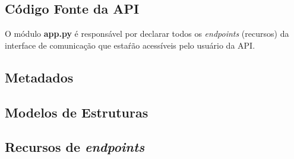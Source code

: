 \documentclass[12pt, openright, oneside, a4paper, brazil]{abntex2}
\begin{document}
\begin{apendicesenv}

	\chapter{Código Fonte da API} \label{source_code}

	O módulo \textbf{app.py} é responsável por declarar todos os \textit{endpoints} (recursos) da interface de comunicação que estaŕão acessíveis pelo usuário da API.

	

	\section{Metadados}

	

	

	

	\section{Modelos de Estruturas}

	

	

	

	\section{Recursos de \textit{endpoints}} \label{endpoint_resources}

	

	


\end{apendicesenv}
\end{document}
